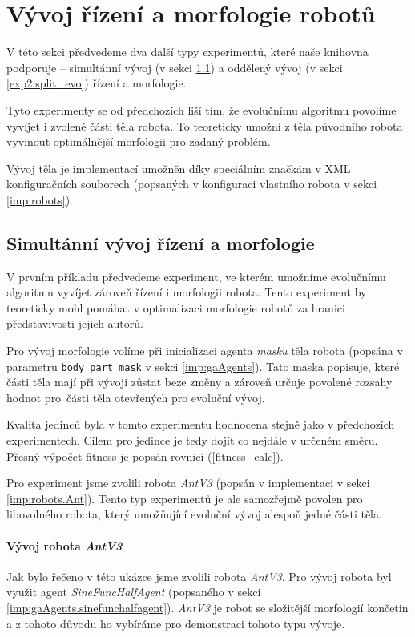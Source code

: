 \section{Vývoj řízení a morfologie robotů} \label{exp2}

V této sekci předvedeme dva další typy experimentů, které naše knihovna
podporuje -- simultánní vývoj (v sekci \ref{exp2:para_evo}) a oddělený
vývoj (v sekci \ref{exp2:split_evo}) řízení a morfologie.

Tyto experimenty se od předchozích liší tím, že evolučnímu algoritmu povolíme
vyvíjet i zvolené části těla robota. To teoreticky umožní z těla původního
robota vyvinout optimálnější morfologii pro zadaný problém.

Vývoj těla je implementací umožněn díky speciálním značkám v XML konfiguračních
souborech (popsaných v konfiguraci vlastního robota v sekci \ref{imp:robots}).

\subsection{Simultánní vývoj řízení a morfologie} \label{exp2:para_evo}

V prvním příkladu předvedeme experiment, ve kterém umožníme evolučnímu
algoritmu vyvíjet zároveň řízení i morfologii robota. Tento experiment by
teoreticky mohl pomáhat v optimalizaci morfologie robotů za hranici
představivosti jejich autorů. 

Pro vývoj morfologie volíme při inicializaci agenta \emph{masku} těla
robota (popsána v parametru \texttt{body\_part\_mask} v sekci
\ref{imp:gaAgents}). Tato maska popisuje, které části těla mají při vývoji
zůstat beze změny a zároveň určuje povolené rozsahy hodnot pro~části
těla otevřených pro evoluční vývoj.

Kvalita jedinců byla v tomto experimentu hodnocena stejně jako v předchozích
experimentech. Cílem pro jedince je tedy dojít co nejdále v určeném směru.
Přesný výpočet fitness je popsán rovnicí (\ref{fitness_calc}). 

Pro experiment jsme zvolili robota \emph{AntV3} (popsán v implementaci v sekci
\ref{imp:robots.Ant}). Tento typ experimentů je ale samozřejmě povolen pro
libovolného robota, který umožňující evoluční vývoj alespoň jedné části těla.

\paragraph{Vývoj robota \emph{AntV3}}
Jak bylo řečeno v této ukázce jsme zvolili robota \emph{AntV3}. Pro vývoj
robota byl využit agent \emph{SineFuncHalfAgent} (popsaného v sekci
\ref{imp:gaAgents.sinefunchalfagent}). \emph{AntV3} je robot se složitější
morfologií končetin a z tohoto důvodu ho vybíráme pro demonstraci tohoto typu
vývoje.

